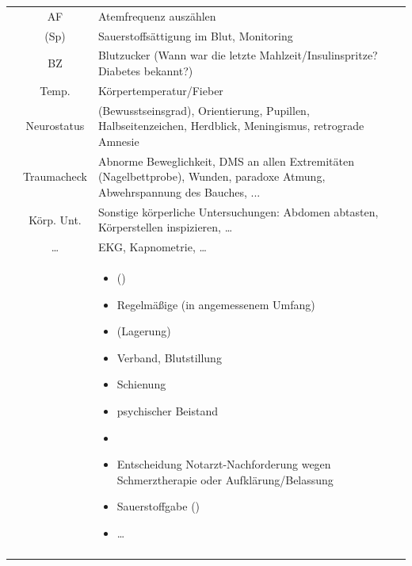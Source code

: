 {\begin{minipage}{\linewidth}
{\begin{tabulary}{\linewidth}[H]{lCL}
{}
 &
{\sffamily AF}
 &
Atemfrequenz auszählen
\\\addlinespace
 &
({\sffamily Sp})
 &
Sauerstoffsättigung im Blut, Monitoring
\\\addlinespace
 &
{\sffamily  BZ}
 &
Blutzucker {\tiny(Wann war die letzte
Mahlzeit/Insulinspritze? Diabetes bekannt?)}
\\\addlinespace
 &
{\sffamily Temp.}
 &
Körpertemperatur/Fieber
\\\addlinespace
 &
 {\sffamily\small Neuro\-status}
 &
(Bewusstseinsgrad), Orientierung,
Pupillen, Halbseitenzeichen, Herdblick, Meningismus,
retrograde Amnesie
\\\addlinespace
 &
{\sffamily\small Trauma\-check}
 &
Abnorme Beweglichkeit, DMS an allen
Extremitäten (Nagelbettprobe), Wunden, paradoxe Atmung,
Abwehrspannung des Bauches, ...
\\\addlinespace
 &
{\sffamily\small Körp. Unt.}
&
Sonstige körperliche Untersuchungen: Abdomen abtasten,
Körperstellen inspizieren, \ldots
\\\addlinespace
 &
{\sffamily\small \ldots}
&
EKG, Kapnometrie, \ldots
\\\addlinespace\midrule\addlinespace
{}
&
&
\begin{minipage}{\linewidth}
\begin{itemize}
  \item {}
  ()
  \item Regelmäßige  {\tiny(in angemessenem Umfang)}
  \item (Lagerung)
  \item Verband, Blutstillung
  \item Schienung
  \item psychischer Beistand
  \item {}
  \item Entscheidung Notarzt-Nachforderung wegen
  Schmerztherapie oder Aufklärung/Belassung
  \item Sauerstoffgabe ()
  \item \ldots
\end{itemize}
\end{minipage}
\\\addlinespace\midrule\addlinespace
{}
&
&
\begin{minipage}{\linewidth}

\end{minipage}
\end{tabulary}}
\end{minipage}}
